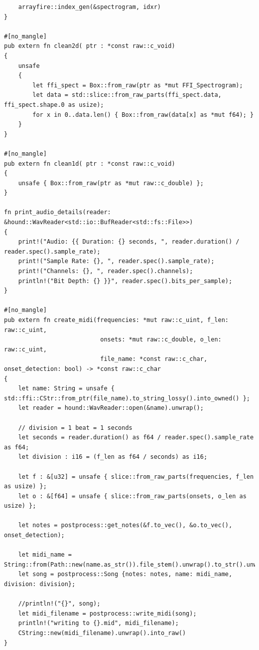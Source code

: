 \documentclass[a4paper,12pt]{report}
\begin{document}
\begin{verbatim}
    arrayfire::index_gen(&spectrogram, idxr)
}

#[no_mangle]
pub extern fn clean2d( ptr : *const raw::c_void) 
{
    unsafe 
    { 
        let ffi_spect = Box::from_raw(ptr as *mut FFI_Spectrogram);
        let data = std::slice::from_raw_parts(ffi_spect.data, ffi_spect.shape.0 as usize);
        for x in 0..data.len() { Box::from_raw(data[x] as *mut f64); }
    }
}

#[no_mangle]
pub extern fn clean1d( ptr : *const raw::c_void)
{
    unsafe { Box::from_raw(ptr as *mut raw::c_double) };
}

fn print_audio_details(reader: &hound::WavReader<std::io::BufReader<std::fs::File>>) 
{
    print!("Audio: {{ Duration: {} seconds, ", reader.duration() / reader.spec().sample_rate);
    print!("Sample Rate: {}, ", reader.spec().sample_rate);
    print!("Channels: {}, ", reader.spec().channels);
    println!("Bit Depth: {} }}", reader.spec().bits_per_sample);
}

#[no_mangle]
pub extern fn create_midi(frequencies: *mut raw::c_uint, f_len: raw::c_uint,
                           onsets: *mut raw::c_double, o_len: raw::c_uint, 
                           file_name: *const raw::c_char, onset_detection: bool) -> *const raw::c_char
{
    let name: String = unsafe { std::ffi::CStr::from_ptr(file_name).to_string_lossy().into_owned() };
    let reader = hound::WavReader::open(&name).unwrap();
    
    // division = 1 beat = 1 seconds
    let seconds = reader.duration() as f64 / reader.spec().sample_rate as f64;
    let division : i16 = (f_len as f64 / seconds) as i16;

    let f : &[u32] = unsafe { slice::from_raw_parts(frequencies, f_len as usize) };
    let o : &[f64] = unsafe { slice::from_raw_parts(onsets, o_len as usize) };    

    let notes = postprocess::get_notes(&f.to_vec(), &o.to_vec(), onset_detection);
    
    let midi_name = String::from(Path::new(name.as_str()).file_stem().unwrap().to_str().unwrap());
    let song = postprocess::Song {notes: notes, name: midi_name, division: division};

    //println!("{}", song);
    let midi_filename = postprocess::write_midi(song);
    println!("writing to {}.mid", midi_filename);
    CString::new(midi_filename).unwrap().into_raw()
}
\end{verbatim}
\newpage
\end{document}

